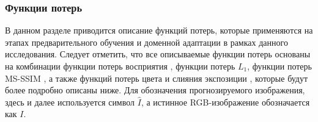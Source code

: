 \subsubsection{Функции потерь}\label{sect-2-1-3}

В данном разделе приводится описание функций потерь, которые применяются на этапах предварительного обучения и доменной адаптации в рамках данного исследования. Следует отметить, что все описываемые функции потерь основаны на комбинации функции потерь восприятия \cite{lib-vgg-loss}, функции потерь $L_1$, функции потерь MS-SSIM \cite{lib-msssim}, а также функций потерь цвета и слияния экспозиции \cite{lib-exp-fusion}, которые будут более подробно описаны ниже. Для обозначения прогнозируемого изображения, здесь и далее используется символ $\hat{I}$, а истинное RGB-изображение обозначается как $I$.








